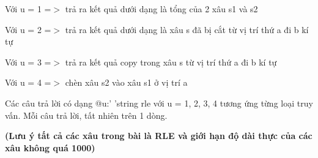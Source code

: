 Với u = 1 =$>$ trả ra kết quả dưới dạng là tổng của 2 xâu s1 và s2

Với u = 2 =$>$ trả ra kết quả dưới dạng là xâu s đã bị cắt từ vị trí thứ a đi b kí tự

Với u = 3 =$>$ trả ra kết quả copy trong xâu s từ vị trí thứ a đi b kí tự

Với u = 4 =$>$ chèn xâu s2 vào xâu s1 ở vị trí a

Các câu trả lời có dạng @u:' 'string rle với u = 1, 2, 3, 4 tương ứng từng loại truy vấn. Mỗi câu trả lời, tất nhiên trên 1 dòng.

\textbf{(Lưu ý tất cả các xâu trong bài là RLE và giới hạn độ dài thực của các xâu không quá 1000) }\textbf{}